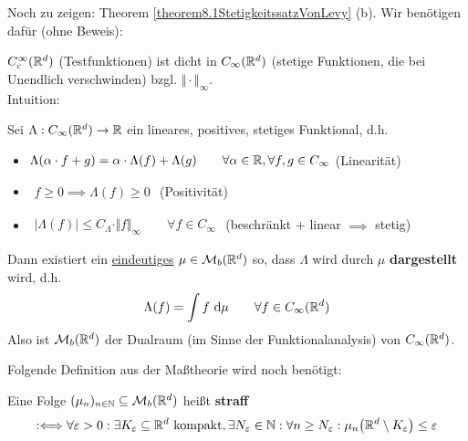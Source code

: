 Noch zu zeigen: Theorem \ref{theorem8.1StetigkeitssatzVonLevy} (b). 
Wir benötigen dafür (ohne Beweis):

\begin{lemma}\label{lemma8.2}
	$C_c^\infty(\mathbb{R}^d)$ (Testfunktionen) ist dicht in $C_\infty(\mathbb{R}^d)$ (stetige Funktionen, die bei Unendlich verschwinden) bzgl. $\Vert\cdot\Vert_\infty$.\\
	Intuition: %
\end{lemma}

\begin{theorem}\label{theorem8.4RieszscherDarstellungssatzFuerM_b}\enter
	Sei $\Lambda:C_\infty(\mathbb{R}^d)\to\mathbb{R}$ ein lineares, positives, stetiges Funktional, d.h.
	\begin{itemize}
		\item $\begin{aligned}
			\Lambda(\alpha\cdot f+g)=\alpha\cdot\Lambda(f)+\Lambda(g)\qquad\forall\alpha\in\mathbb{R},\forall f,g\in C_\infty
		\end{aligned}$ (Linearität)
		\item $\begin{aligned}
			f\geq0\implies\Lambda(f)\geq0
		\end{aligned}$ (Positivität)
		\item $\begin{aligned}
			\big|\Lambda(f)\big|\leq C_\Lambda\cdot\Vert f\Vert_\infty\qquad\forall f\in C_\infty
		\end{aligned}$ (beschränkt + linear $\implies$ stetig)
	\end{itemize} 
	Dann existiert ein \underline{eindeutiges} $\mu\in\mathcal{M}_b(\mathbb{R}^d)$ so, dass $\Lambda$ wird durch $\mu$ \textbf{dargestellt} wird, d.h.
	\begin{align*}
		\Lambda(f)=\int\limits f\text{ d}\mu\qquad\forall f\in C_\infty(\mathbb{R}^d)
	\end{align*}
	Also ist $\mathcal{M}_b(\mathbb{R}^d)$ der Dualraum (im Sinne der Funktionalanalysis) von $C_\infty(\mathbb{R}^d)$.
\end{theorem}

Folgende Definition aus der Maßtheorie wird noch benötigt:

\begin{defi}[Straffheit]
	Eine Folge $(\mu_n)_{n\in\mathbb{N}}\subseteq\mathcal{M}_b(\mathbb{R}^d)$ heißt \textbf{straff}
	\begin{align*}
		:\Longleftrightarrow
		\forall\varepsilon>0:\exists K_\varepsilon\subseteq\mathbb{R}^d\text{ kompakt},\exists N_\varepsilon\in\mathbb{N}:\forall n\geq N_\varepsilon:
		\mu_n\big(\mathbb{R}^d\setminus K_\varepsilon\big)\leq\varepsilon
	\end{align*}
\end{defi}


